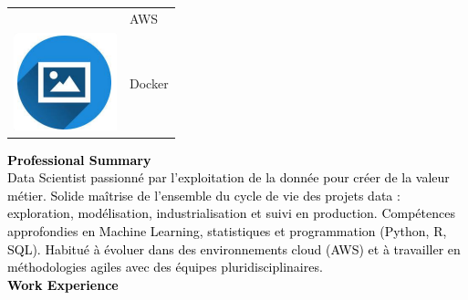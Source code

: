 \documentclass{article}
\begin{document}
\begin{paracol}{2}
\begin{tabular}{ll}
\begin{minipage}{0.1\linewidth}
         \end{minipage} & AWS \\[10pt]
         \begin{minipage}{0.1\linewidth}
         \includegraphics[width=\linewidth]{picon.png}
         \end{minipage} & Docker \\[10pt]
        \end{tabular}
        
\switchcolumn
\color{black}

\textcolor{black}{\Large \textbf{Professional Summary}} \\

\textcolor{black}{Data Scientist passionné par l’exploitation de la donnée pour créer de la valeur métier. Solide maîtrise de l’ensemble du cycle de vie des projets data : exploration, modélisation, industrialisation et suivi en production. Compétences approfondies en Machine Learning, statistiques et programmation (Python, R, SQL). Habitué à évoluer dans des environnements cloud (AWS) et à travailler en méthodologies agiles avec des équipes pluridisciplinaires.}\\[8pt]

\textcolor{black}{\Large \textbf{Work Experience}} \\


\end{paracol}
\end{document}

